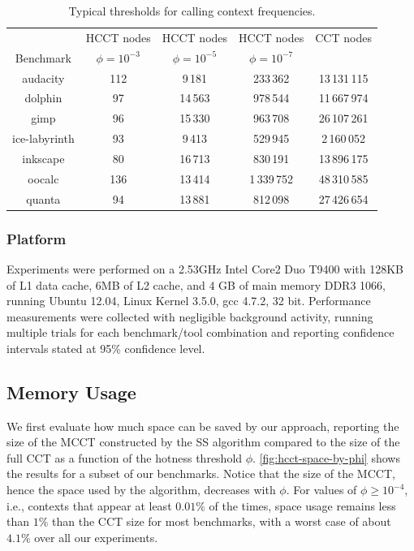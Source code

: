 \begin{table}[ht]
\vspace{2mm}
\begin{center}
\begin{tabular}{c c c c c}
\hline
  & HCCT nodes  & HCCT nodes & HCCT nodes & CCT nodes \\ 
Benchmark & $\phi=10^{-3}$  & $\phi=10^{-5}$ & $\phi=10^{-7}$ \\ 
\hline
audacity & 112 & 9\,181 & 233\,362 & 13\,131\,115 \\
dolphin & 97 & 14\,563 & 978\,544 & 11\,667\,974 \\
gimp & 96 & 15\,330 & 963\,708 & 26\,107\,261 \\
ice-labyrinth & 93 & 9\,413 & 529\,945 & 2\,160\,052 \\
inkscape & 80 & 16\,713 & 830\,191 & 13\,896\,175 \\
oocalc & 136 & 13\,414 & 1\,339\,752 & 48\,310\,585 \\
quanta & 94 & 13\,881 & 812\,098 & 27\,426\,654 \\
\hline
\end{tabular}
\vspace{3mm}
\caption{\label{tab:hcct-phi} Typical thresholds for calling context frequencies.}
\end{center}
\end{table}
\ifauthorea{\newline}{}

\subsubsection*{Platform}

Experiments were performed on a 2.53GHz Intel Core2 Duo T9400 with 128KB of L1 data cache, 6MB of L2 cache, and 4 GB of main memory DDR3 1066, running Ubuntu 12.04, Linux Kernel 3.5.0, gcc 4.7.2, 32 bit. Performance measurements were collected with negligible background activity, running multiple trials for each benchmark/tool combination and reporting confidence intervals stated at 95\% confidence level.

\subsection{Memory Usage}
\label{ss:eval-hcct-memory}

We first evaluate how much space can be saved by our approach, reporting the size of the MCCT constructed by the SS algorithm compared to the size of the full CCT as a function of the hotness threshold $\phi$. \myfigure\ref{fig:hcct-space-by-phi} shows the results for a subset of our benchmarks. Notice that the size of the MCCT, hence the space used by the algorithm, decreases with $\phi$. For values of $\phi\ge 10^{-4}$, i.e., contexts that appear at least $0.01\%$ of the times, space usage remains less than $1\%$ than the CCT size for most benchmarks, with a worst case of about $4.1\%$ over all our experiments.


